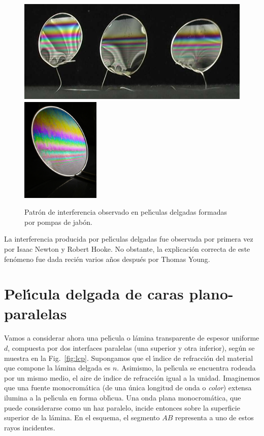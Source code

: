 \documentclass[a4paper]{article}
\begin{document}
\begin{figure}
\centering
\includegraphics[height=5cm]{int_2.jpg}\includegraphics[height=5cm]{pic19.jpg}
\caption{Patr\'on de interferencia observado en pel\'\i culas delgadas
formadas por pompas de jab\'on.}
\label{fig:pompasjabon}
\end{figure}

La interferencia producida por pel\'\i culas delgadas fue observada por primera
vez por Isaac Newton y Robert Hooke. No obstante, la explicaci\'on correcta de
este fen\'omeno fue dada reci\'en varios a\~nos despu\'es por Thomas Young.

\section{Pel\'\i cula delgada de caras plano-paralelas}

Vamos a considerar ahora una pel\'\i cula o l\'amina transparente de espesor
uniforme $d$, compuesta por dos interfaces paralelas (una superior y otra 
inferior), seg\'un se muestra en la Fig.~\ref{fig:lcp}. Supongamos que el 
\'\i ndice de refracci\'on del material que compone la l\'amina delgada 
es $n$. Asimismo, la pel\'\i cula se encuentra rodeada por un mismo medio, 
el aire de \'\i ndice de refracci\'on igual a la unidad. 
Imaginemos que una fuente monocrom\'atica (de una \'unica longitud
de onda o {\it color}) extensa ilumina a la pel\'\i cula en forma obl\'\i cua.
Una onda plana monocrom\'atica, que puede considerarse como un haz paralelo, 
incide entonces sobre la superficie superior de la l\'amina. En el esquema,
el segmento $AB$ representa a uno de estos rayos incidentes.
\end{document}
